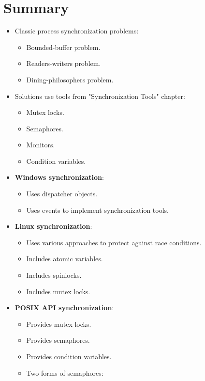 \section{Summary}

\begin{itemize}
    \item Classic process synchronization problems:
    \begin{itemize}
        \item Bounded-buffer problem.
        \item Readers-writers problem.
        \item Dining-philosophers problem.
    \end{itemize}
    \item Solutions use tools from "Synchronization Tools" chapter:
    \begin{itemize}
        \item Mutex locks.
        \item Semaphores.
        \item Monitors.
        \item Condition variables.
    \end{itemize}
    \item \textbf{Windows synchronization}:
    \begin{itemize}
        \item Uses dispatcher objects.
        \item Uses events to implement synchronization tools.
    \end{itemize}
    \item \textbf{Linux synchronization}:
    \begin{itemize}
        \item Uses various approaches to protect against race conditions.
        \item Includes atomic variables.
        \item Includes spinlocks.
        \item Includes mutex locks.
    \end{itemize}
    \item \textbf{POSIX API synchronization}:
    \begin{itemize}
        \item Provides mutex locks.
        \item Provides semaphores.
        \item Provides condition variables.
        \item Two forms of semaphores:

\end{itemize}
\end{itemize}
